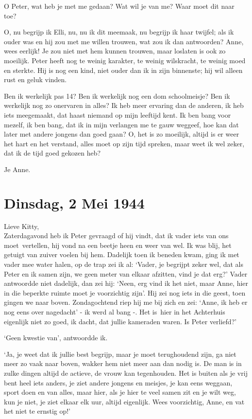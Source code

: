 \documentclass{book}
\begin{document}
O Peter, wat heb je met me gedaan? Wat wil je van me? Waar moet dit naar
toe?

O, nu begrijp ik Elli, nu, nu ik dit meemaak, nu begrijp ik haar
twijfel; als ik ouder was en hij zou met me willen trouwen, wat zou ik
dan antwoorden? Anne, wees eerlijk! Je zou niet met hem kunnen trouwen,
maar loslaten is ook zo moeilijk. Peter heeft nog te weinig karakter, te
weinig wilskracht, te weinig moed en sterkte. Hij is nog een kind, niet
ouder dan ik in zijn binnenste; hij wil alleen rust en geluk vinden.

Ben ik werkelijk pas 14? Ben ik werkelijk nog een dom schoolmeisje? Ben
ik werkelijk nog zo onervaren in alles? Ik heb meer ervaring dan de
anderen, ik heb iets meegemaakt, dat haast niemand op mijn leeftijd
kent. Ik ben bang voor mezelf, ik ben bang, dat ik in mijn verlangen me
te gauw weggeef, hoe kan dat later met andere jongens dan goed gaan? O,
het is zo moeilijk, altijd is er weer het hart en het verstand, alles
moet op zijn tijd spreken, maar weet ik wel zeker, dat ik de tijd goed
gekozen heb?

Je Anne.

\chapter{Dinsdag, 2 Mei 1944}

Lieve Kitty,\\Zaterdagavond heb ik Peter gevraagd of hij vindt, dat ik
vader iets van ons moet~vertellen, hij vond na een beetje heen en weer
van wel. Ik was blij, het getuigt van zuiver voelen bij hem. Dadelijk
toen ik beneden kwam, ging ik met vader mee water halen, op de trap zei
ik al: `Vader, je begrijpt zeker wel, dat als Peter en ik samen zijn, we
geen meter van elkaar afzitten, vind je dat erg?' Vader antwoordde niet
dadelijk, dan zei hij: `Neen, erg vind ik het niet, maar Anne, hier in
die beperkte ruimte moet je voorzichtig zijn'. Hij zei nog iets in die
geest, toen gingen we naar boven. Zondagochtend riep hij me bij zich en
zei: `Anne, ik heb er nog eens over nagedacht' - ik werd al bang -. Het
is~hier in het Achterhuis eigenlijk niet zo goed, ik dacht, dat jullie
kameraden waren. Is Peter verliefd?'

`Geen kwestie van', antwoordde ik.

`Ja, je weet dat ik jullie best begrijp, maar je moet terughoudend zijn,
ga niet meer zo vaak naar boven, wakker hem niet meer aan dan nodig is.
De man is in zulke dingen altijd de actieve, de vrouw kan tegenhouden.
Het is buiten als je vrij bent heel iets anders, je ziet andere jongens
en meisjes, je kan eens weggaan, sport doen en van alles, maar hier, als
je hier te veel samen zit en je wilt weg, kun je niet, je ziet elkaar
elk uur, altijd eigenlijk. Wees voorzichtig, Anne, en vat het niet te
ernstig op!'
\end{document}
